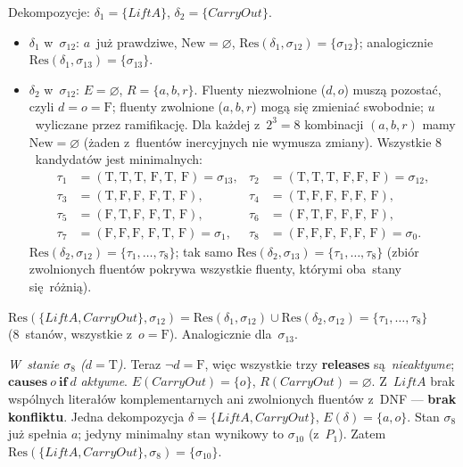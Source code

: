 \documentclass[11pt,a4paper]{article}
\newcommand{\causes}{\textbf{causes}}
\renewcommand{\iff}{\textbf{if}}
\newcommand{\releases}{\textbf{releases}}
\theoremstyle{definition}
\begin{document}
\smallskip\noindent
Dekompozycje: $\delta_1 = \{\mathit{LiftA}\}$, $\delta_2 = \{\mathit{CarryOut}\}$.
\begin{itemize}[topsep=2pt]
  \item $\delta_1$ w~$\sigma_{12}$: $a$~już prawdziwe, $\mathrm{New} = \varnothing$,
        $\mathrm{Res}(\delta_1, \sigma_{12}) = \{\sigma_{12}\}$; analogicznie
        $\mathrm{Res}(\delta_1, \sigma_{13}) = \{\sigma_{13}\}$.
  \item $\delta_2$ w~$\sigma_{12}$: $E = \varnothing$, $R = \{a, b, r\}$.
        Fluenty nie\-zwolnione ($d, o$) muszą pozostać, czyli $d = o = \text{F}$;
        fluenty zwolnione ($a, b, r$) mogą się zmieniać swobodnie; $u$~wyliczane
        przez ramifikację. Dla każdej z~$2^3 = 8$ kombinacji $(a, b, r)$
        mamy $\mathrm{New} = \varnothing$ (żaden z~fluentów inercyjnych
        nie wymusza zmiany). Wszystkie $8$~kandydatów jest minimalnych:
        \begin{align*}
          \tau_1 &= (\text{T},\text{T},\text{T},\,\text{F},\text{T},\,\text{F}) = \sigma_{13}, &
          \tau_2 &= (\text{T},\text{T},\text{T},\,\text{F},\text{F},\,\text{F}) = \sigma_{12}, \\
          \tau_3 &= (\text{T},\text{F},\text{F},\,\text{F},\text{T},\,\text{F}), &
          \tau_4 &= (\text{T},\text{F},\text{F},\,\text{F},\text{F},\,\text{F}), \\
          \tau_5 &= (\text{F},\text{T},\text{F},\,\text{F},\text{T},\,\text{F}), &
          \tau_6 &= (\text{F},\text{T},\text{F},\,\text{F},\text{F},\,\text{F}), \\
          \tau_7 &= (\text{F},\text{F},\text{F},\,\text{F},\text{T},\,\text{F}) = \sigma_1, &
          \tau_8 &= (\text{F},\text{F},\text{F},\,\text{F},\text{F},\,\text{F}) = \sigma_0.
        \end{align*}
        $\mathrm{Res}(\delta_2, \sigma_{12}) = \{\tau_1, \ldots, \tau_8\}$;
        tak samo $\mathrm{Res}(\delta_2, \sigma_{13}) = \{\tau_1, \ldots, \tau_8\}$
        (zbiór zwolnionych fluentów pokrywa wszystkie fluenty, którymi oba~stany
        się~różnią).
\end{itemize}
$\mathrm{Res}(\{\mathit{LiftA}, \mathit{CarryOut}\}, \sigma_{12}) =
\mathrm{Res}(\delta_1, \sigma_{12}) \cup \mathrm{Res}(\delta_2, \sigma_{12})
= \{\tau_1, \ldots, \tau_8\}$ (8~stanów, wszystkie z~$o = \text{F}$).
Analogicznie dla~$\sigma_{13}$.

\smallskip\noindent
\emph{W~stanie $\sigma_8$ ($d = \text{T}$).}
Teraz $\neg d = \text{F}$, więc wszystkie trzy \releases{} są~\emph{nieaktywne};
$\causes\ o\ \iff\ d$ \emph{aktywne}. $E(\mathit{CarryOut}) = \{o\}$,
$R(\mathit{CarryOut}) = \varnothing$. Z~$\mathit{LiftA}$ brak wspólnych literałów
komplementarnych ani zwolnionych fluentów z~DNF --- \textbf{brak konfliktu}.
Jedna dekompozycja $\delta = \{\mathit{LiftA}, \mathit{CarryOut}\}$,
$E(\delta) = \{a, o\}$. Stan $\sigma_8$ już spełnia $a$; jedyny minimalny stan
wynikowy to $\sigma_{10}$ (z~$P_1$). Zatem
$\mathrm{Res}(\{\mathit{LiftA}, \mathit{CarryOut}\}, \sigma_8) = \{\sigma_{10}\}$.
\end{document}
